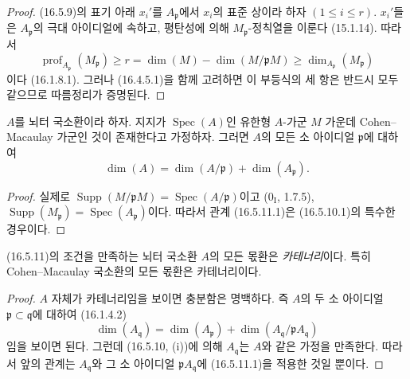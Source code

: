 \begin{proof}
(16.5.9)의 표기 아래 $x_i'$를 $A_{\mathfrak{p}}$에서 $x_i$의 표준
상이라 하자 $(1\leq i\leq r)$. $x_i'$들은
$A_{\mathfrak{p}}$의 극대 아이디얼에 속하고, 평탄성에 의해
$M_{\mathfrak{p}}$-정칙열을 이룬다 (15.1.14). 따라서
\[
  \operatorname{prof}_{A_{\mathfrak{p}}}(M_{\mathfrak{p}})
  \geq r=\dim(M)-\dim(M/\mathfrak{p}M)
  \geq\dim_{A_{\mathfrak{p}}}(M_{\mathfrak{p}})
\]
이다 (16.1.8.1). 그러나 (16.4.5.1)을 함께 고려하면 이 부등식의 세
항은 반드시 모두 같으므로 따름정리가 증명된다.
\end{proof}


\begin{corollary}[16.5.11]
\label{0.16.5.11-fr}
$A$를 뇌터 국소환이라 하자. 지지가 $\operatorname{Spec}(A)$인 유한형
$A$-가군 $M$ 가운데 Cohen--Macaulay 가군인 것이 존재한다고
가정하자. 그러면 $A$의 모든 소 아이디얼 $\mathfrak{p}$에 대하여
\begin{equation}
\label{0.16.5.11.1-fr}
\tag{16.5.11.1}
  \dim(A)=\dim(A/\mathfrak{p})+\dim(A_{\mathfrak{p}}).
\end{equation}
\end{corollary}

\begin{proof}
실제로 $\operatorname{Supp}(M/\mathfrak{p}M)
=\operatorname{Spec}(A/\mathfrak{p})$이고 ($0_{\mathrm I}$, 1.7.5),
$\operatorname{Supp}(M_{\mathfrak{p}})
=\operatorname{Spec}(A_{\mathfrak{p}})$이다. 따라서 관계 (16.5.11.1)은
(16.5.10.1)의 특수한 경우이다.
\end{proof}

\begin{corollary}[16.5.12]
\label{0.16.5.12-fr}
(16.5.11)의 조건을 만족하는 뇌터 국소환 $A$의 모든 몫환은
\emph{카테너리}이다. 특히 Cohen--Macaulay 국소환의 모든 몫환은
카테너리이다.
\end{corollary}

\begin{proof}
$A$ 자체가 카테너리임을 보이면 충분함은 명백하다. 즉 $A$의 두 소
아이디얼 $\mathfrak{p}\subset\mathfrak{q}$에 대하여 (16.1.4.2)
\[
  \dim(A_{\mathfrak{q}})
  =\dim(A_{\mathfrak{p}})
  +\dim(A_{\mathfrak{q}}/\mathfrak{p}A_{\mathfrak{q}})
\]
임을 보이면 된다. 그런데 (16.5.10, (i))에 의해
$A_{\mathfrak{q}}$는 $A$와 같은 가정을 만족한다. 따라서 앞의 관계는
$A_{\mathfrak{q}}$와 그 소 아이디얼
$\mathfrak{p}A_{\mathfrak{q}}$에 (16.5.11.1)을 적용한 것일 뿐이다.
\end{proof}

